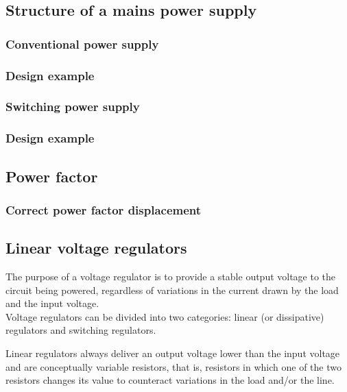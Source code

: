 \documentclass[../main.tex]{subfiles}
\begin{document}
\subsection{Structure of a mains power supply}


\subsubsection{Conventional power supply}




\subsubsection{Design example}
\subsubsection{Switching power supply}
\subsubsection{Design example}

\subsection{Power factor}



\subsubsection{Correct power factor displacement}



\subsection{Linear voltage regulators}


The purpose of a voltage regulator is to provide a stable output voltage to the circuit being powered, regardless of variations in the current drawn by the load and the input voltage.\\

Voltage regulators can be divided into two categories: linear (or dissipative) regulators and switching regulators.

Linear regulators always deliver an output voltage lower than the input voltage and are conceptually variable resistors, that is, resistors in which one of the two resistors changes its value to counteract variations in the load and/or the line.\\
\end{document}
